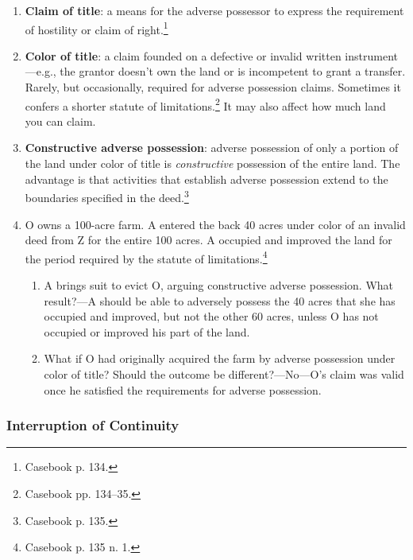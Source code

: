 \begin{enumerate}
    \item \textbf{Claim of title}: a means for the adverse possessor to 
    express the requirement of hostility or claim of right.\footnote{Casebook 
    p. 134.}
    \item \textbf{Color of title}: a claim founded on a defective or invalid 
    written instrument---e.g., the grantor doesn't own the land or is 
    incompetent to grant a transfer. Rarely, but occasionally, required for 
    adverse possession claims. Sometimes it confers a shorter statute of 
    limitations.\footnote{Casebook pp. 134--35.} It may also affect how much 
    land you can claim.
    \item \textbf{Constructive adverse possession}: adverse possession of only 
    a portion of the land under color of title is \emph{constructive} 
    possession of the entire land. The advantage is that activities that 
    establish adverse possession extend to the boundaries specified in the 
    deed.\footnote{Casebook p. 135.}
    \item O owns a 100-acre farm. A entered the back 40 acres under color of 
    an invalid deed from Z for the entire 100 acres. A occupied and improved 
    the land for the period required by the statute of 
    limitations.\footnote{Casebook p. 135 n. 1.}
    \begin{enumerate}
        \item A brings suit to evict O, arguing constructive adverse 
        possession. What result?---A should be able to adversely possess the 
        40 acres that she has occupied and improved, but not the other 
        60 acres, unless O has not occupied or improved his part of the land.
        \item What if O had originally acquired the farm by adverse possession 
        under color of title? Should the outcome be different?---No---O's 
        claim was valid once he satisfied the requirements for adverse 
        possession.
    \end{enumerate}
\end{enumerate}

\subsubsection{Interruption of Continuity}

